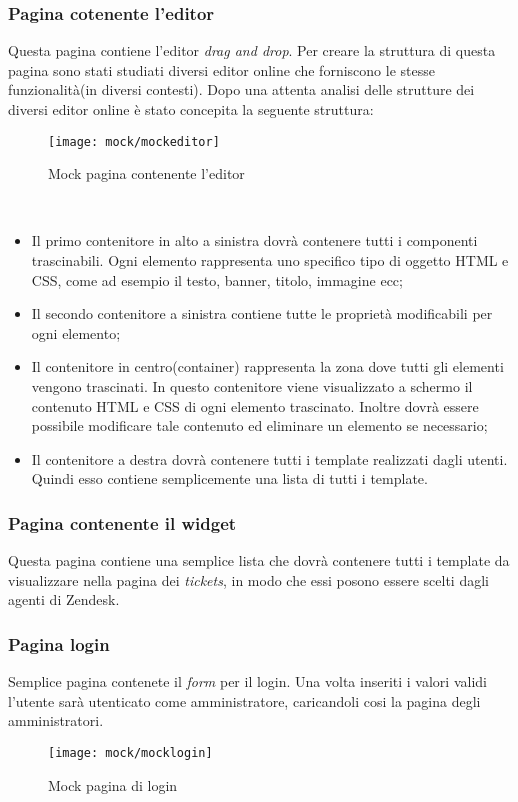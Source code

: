 \subsubsection{Pagina cotenente l'editor}
Questa pagina contiene l'editor \emph{drag and drop}. Per creare la struttura di questa pagina sono stati studiati diversi editor online che forniscono le stesse funzionalità(in diversi contesti). Dopo una attenta analisi delle strutture dei diversi editor online è stato concepita la seguente struttura:
\begin{figure}[!h] 
	\centering 
	\texttt{[image: mock/mockeditor]} 
	\caption{Mock pagina contenente l'editor}
\end{figure}  
\\
\begin{itemize}
	\item Il primo contenitore in alto a sinistra dovrà contenere tutti i componenti trascinabili. Ogni elemento rappresenta uno specifico tipo di oggetto HTML e CSS, come ad esempio il testo, banner, titolo, immagine ecc;
	\item Il secondo contenitore a sinistra contiene tutte le proprietà modificabili per ogni elemento;
	\item Il contenitore in centro(container) rappresenta la zona dove tutti gli elementi vengono trascinati. In questo contenitore viene visualizzato a schermo il contenuto HTML e CSS di ogni elemento trascinato. Inoltre dovrà essere possibile modificare tale contenuto ed eliminare un elemento se necessario;
	\item Il contenitore a destra dovrà contenere tutti i template realizzati dagli utenti. Quindi esso contiene semplicemente una lista di tutti i template.  
\end{itemize}

\subsubsection{Pagina contenente il widget} Questa pagina contiene una semplice lista che dovrà contenere tutti i template da visualizzare nella pagina dei \emph{tickets}, in modo che essi posono essere scelti dagli agenti di Zendesk.
\\ 
\subsubsection{Pagina login}
Semplice pagina contenete il \emph{form} per il login. Una volta inseriti i valori validi l'utente sarà utenticato come amministratore, caricandoli cosi la pagina degli amministratori. 
\begin{figure}[!h] 
	\centering 
	\texttt{[image: mock/mocklogin]} 
	\caption{Mock pagina di login}
\end{figure}  \newpage
